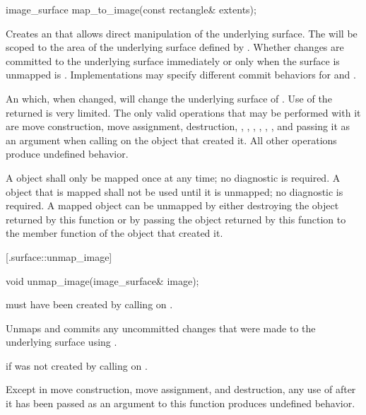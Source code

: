 \begin{itemdecl}
image_surface map_to_image(const rectangle& extents);
\end{itemdecl}
\begin{itemdescr}
	\pnum
	\effects
	Creates an  that allows direct manipulation of the underlying surface. The  will be scoped to the area of the underlying surface defined by . Whether changes are committed to the underlying surface immediately or only when the surface is unmapped is . Implementations may specify different commit behaviors for  and .
	
	\pnum
	\returns
	An  which, when changed, will change the underlying surface of . 
	\enternote
	Use of the returned  is very limited. The only valid operations that may be performed with it are move construction, move assignment, destruction, , , , , , , and passing it as an argument when calling  on the  object that created it. All other operations produce undefined behavior.
	\exitnote
	
	\pnum
	\remarks
	A  object shall only be mapped once at any time; no diagnostic is required. A  object that is mapped shall not be used until it is unmapped; no diagnostic is required. A mapped  object can be unmapped by either destroying the  object returned by this function or by passing the  object returned by this function to the  member function of the  object that created it. 
\end{itemdescr}

 [\iotwod.surface::unmap_image] {}

%
%
\begin{itemdecl}
void unmap_image(image_surface& image);
\end{itemdecl}
\begin{itemdescr}
	\pnum
	\requires
	 must have been created by calling  on .
	
	\pnum
	\effects
	Unmaps  and commits any uncommitted changes that were made to the underlying surface using .
	
	\pnum
	\throws
	 if  was not created by calling  on .
	
	\pnum
	\remarks
	Except in move construction, move assignment, and destruction, any use of  after it has been passed as an argument to this function produces undefined behavior.
\end{itemdescr}

